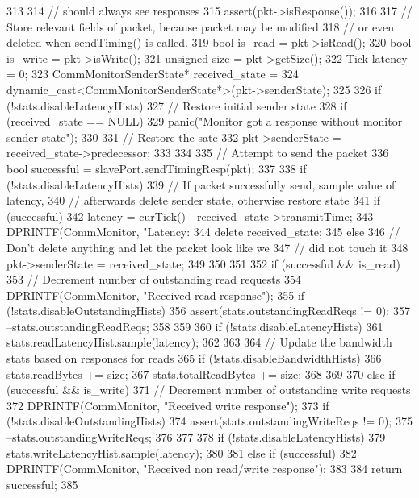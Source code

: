 \begin{DoxyCode}
313 {
314     // should always see responses
315     assert(pkt->isResponse());
316 
317     // Store relevant fields of packet, because packet may be modified
318     // or even deleted when sendTiming() is called.
319     bool is_read = pkt->isRead();
320     bool is_write = pkt->isWrite();
321     unsigned size = pkt->getSize();
322     Tick latency = 0;
323     CommMonitorSenderState* received_state =
324         dynamic_cast<CommMonitorSenderState*>(pkt->senderState);
325 
326     if (!stats.disableLatencyHists) {
327         // Restore initial sender state
328         if (received_state == NULL)
329             panic("Monitor got a response without monitor sender state\n");
330 
331         // Restore the sate
332         pkt->senderState = received_state->predecessor;
333     }
334 
335     // Attempt to send the packet
336     bool successful = slavePort.sendTimingResp(pkt);
337 
338     if (!stats.disableLatencyHists) {
339         // If packet successfully send, sample value of latency,
340         // afterwards delete sender state, otherwise restore state
341         if (successful) {
342             latency = curTick() - received_state->transmitTime;
343             DPRINTF(CommMonitor, "Latency: %
344             delete received_state;
345         } else {
346             // Don't delete anything and let the packet look like we
347             // did not touch it
348             pkt->senderState = received_state;
349         }
350     }
351 
352     if (successful && is_read) {
353         // Decrement number of outstanding read requests
354         DPRINTF(CommMonitor, "Received read response\n");
355         if (!stats.disableOutstandingHists) {
356             assert(stats.outstandingReadReqs != 0);
357             --stats.outstandingReadReqs;
358         }
359 
360         if (!stats.disableLatencyHists) {
361             stats.readLatencyHist.sample(latency);
362         }
363 
364         // Update the bandwidth stats based on responses for reads
365         if (!stats.disableBandwidthHists) {
366             stats.readBytes += size;
367             stats.totalReadBytes += size;
368         }
369 
370     } else if (successful && is_write) {
371         // Decrement number of outstanding write requests
372         DPRINTF(CommMonitor, "Received write response\n");
373         if (!stats.disableOutstandingHists) {
374             assert(stats.outstandingWriteReqs != 0);
375             --stats.outstandingWriteReqs;
376         }
377 
378         if (!stats.disableLatencyHists) {
379             stats.writeLatencyHist.sample(latency);
380         }
381     } else if (successful) {
382         DPRINTF(CommMonitor, "Received non read/write response\n");
383     }
384     return successful;
385 }
\end{DoxyCode}
